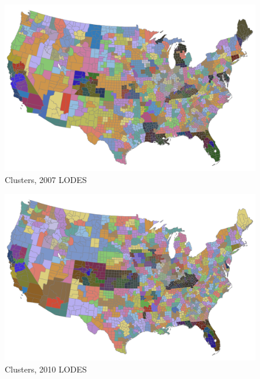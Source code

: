 

\begin{figure}
\caption{Clusters, 2007 LODES \label{fig:lodes2007}}
\includegraphics[scale=.5]{./figures/lodes_2007.png}
\end{figure}
\begin{figure}
\caption{Clusters, 2010 LODES \label{fig:lodes2010}}
\includegraphics[scale=.5]{./figures/lodes_2010.png}
\end{figure}


